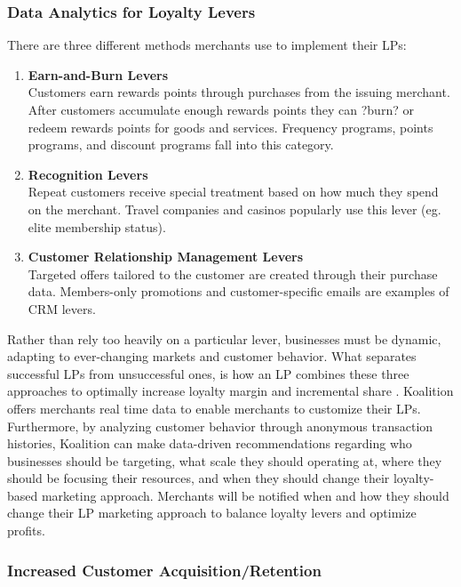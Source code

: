 \subsubsection{Data Analytics for Loyalty Levers}
There are three different methods merchants use to implement their LPs:
%
\begin{enumerate}
\item \textbf{Earn-and-Burn Levers} \\ 
Customers earn rewards points through purchases from the issuing merchant. After customers accumulate enough rewards points they can ?burn? or redeem rewards points for goods and services. Frequency programs, points programs, and discount programs fall into this category.

\item \textbf{Recognition Levers} \\ 
Repeat customers receive special treatment based on how much they spend on the merchant. Travel companies and casinos popularly use this lever (eg. elite membership status).

\item \textbf{Customer Relationship Management Levers} \\ 
Targeted offers tailored to the customer are created through their purchase data. Members-only promotions and customer-specific emails are examples of CRM levers.
\end{enumerate}

Rather than rely too heavily on a particular lever, businesses must be dynamic, adapting to ever-changing markets and customer behavior. What separates successful LPs from unsuccessful ones, is how an LP combines these three approaches to optimally increase loyalty margin and incremental share \cite{Bolden14}. Koalition offers merchants real time data to enable merchants to customize their LPs. Furthermore, by analyzing customer behavior through anonymous transaction histories, Koalition can make data-driven recommendations regarding who businesses should be targeting, what scale they should operating at, where they should be focusing their resources, and when they should change their loyalty-based marketing approach. Merchants will be notified when and how they should change their LP marketing approach to balance loyalty levers and optimize profits.

\subsubsection{Increased Customer Acquisition/Retention}

